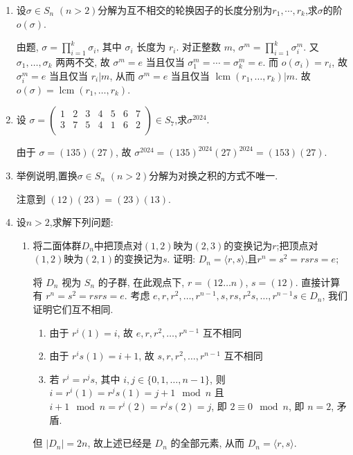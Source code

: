 \begin{enumerate}
\item 设$\sigma \in S_{n}$ $(n>2)$分解为互不相交的轮换因子的长度分别为$r_{1}, \cdots, r_{k}$,求$\sigma$的阶$o(\sigma)$.
\begin{solution}
    由题, $\sigma=\prod\limits_{i=1}^k \sigma_i$, 其中 $\sigma_i$ 长度为 $r_i$.
    对正整数 $m$,
    $\sigma^m=\prod\limits_{i=1}^k \sigma_i^m$.
    又 $\sigma_1,\dots,\sigma_k$ 两两不交,
    故 $\sigma^m=e$ 当且仅当 $\sigma_1^m=\cdots=\sigma_k^m=e$.
    而 $o(\sigma_i)=r_i$,
    故 $\sigma_i^m=e$ 当且仅当 $r_i|m$,
    从而 $\sigma^m=e$ 当且仅当 $\operatorname{lcm}(r_1,\dots,r_k)|m$. 
    故 $o(\sigma)=\operatorname{lcm}(r_1,\dots,r_k)$. 
\end{solution}

\item 设
$\sigma = \begin{pmatrix}
  1 & 2 & 3 & 4 & 5 & 6 & 7 \\
  3 & 7 & 5 & 4 & 1 & 6 & 2 \\
\end{pmatrix} \in S_{7}$,求$\sigma^{2024}$.
\begin{solution}
    由于 $\sigma=(135)(27)$,
    故 $\sigma^{2024}=(135)^{2024}(27)^{2024}=(153)(27)$. 
\end{solution}

\item 举例说明,置换$\sigma \in S_{n}$ $(n>2)$分解为对换之积的方式不唯一.
\begin{solution}
    注意到 $(12)(23)=(23)(13)$. 
\end{solution}

\item 设$n>2$,求解下列问题:
\begin{enumerate}
\item[(1)] 将二面体群$D_{n}$中把顶点对$(1,2)$映为$(2,3)$的变换记为$r$;把顶点对$(1,2)$映为$(2,1)$的变换记为$s$.
证明: $D_n=\langle r, s\rangle$,且$r^{n}=s^{2}=r s r s= e$;
\begin{solution}
    将 $D_n$ 视为 $S_n$ 的子群,
    在此观点下,
    $r=(12\dots n)$, $s=(12)$. 
    直接计算有 $r^n=s^2=rsrs=e$.
    考虑 $e,r,r^2,\dots,r^{n-1},s,rs,r^2s,\dots,r^{n-1}s\in D_n$,
    我们证明它们互不相同.
    \begin{enumerate}
        \item[(i)]
        由于 $r^i(1)=i$, 故 $e,r,r^2,\dots,r^{n-1}$ 互不相同
        \item[(ii)]
        由于 $r^is(1)=i+1$, 故 $s,r,r^2,\dots,r^{n-1}$ 互不相同
        \item[(iii)]
        若 $r^i=r^js$, 其中 $i,j\in\{0,1,\dots,n-1\}$, 则 $i=r^i(1)=r^js(1)=j+1\mod n$ 且 $i+1\mod n=r^i(2)=r^js(2)=j$, 即 $2\equiv 0 \mod n$, 即 $n=2$, 矛盾. 
    \end{enumerate}
    但 $|D_n|=2n$, 故上述已经是 $D_n$ 的全部元素, 从而 $D_n=\langle r,s \rangle$. 
\end{solution}


\end{enumerate}
\end{enumerate}
